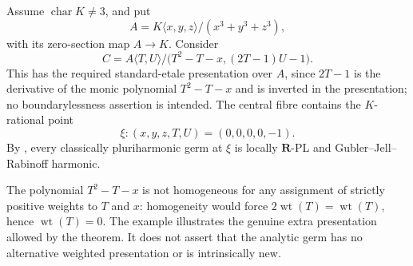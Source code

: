 \begin{example}
\label{ex:p061-standard-etale-weighted-cone-nonhomogeneous}
Assume \(\operatorname{char}K\ne3\), and put
\[
 A=K\langle x,y,z\rangle/(x^3+y^3+z^3),
\]
with its zero-section map \(A\to K\).  Consider
\[
 C=A\langle T,U\rangle/
       \bigl(T^2-T-x,(2T-1)U-1\bigr).
\]
This has the required standard-etale presentation over \(A\), since
\(2T-1\) is the derivative of the monic polynomial \(T^2-T-x\) and is
inverted in the presentation; no boundarylessness assertion is intended.
The central fibre contains the \(K\)-rational point
\[
             \xi:(x,y,z,T,U)=(0,0,0,0,-1).
\]
By , every classically
pluriharmonic germ at \(\xi\) is locally \(\mathbf R\)-PL and
Gubler--Jell--Rabinoff harmonic.

The polynomial \(T^2-T-x\) is not homogeneous for any assignment of
strictly positive weights to \(T\) and \(x\): homogeneity would force
\(2\operatorname{wt}(T)=\operatorname{wt}(T)\), hence
\(\operatorname{wt}(T)=0\).  The example illustrates the genuine extra
presentation allowed by the theorem.  It does not assert that the analytic
germ has no alternative weighted presentation or is intrinsically new.
\end{example}
